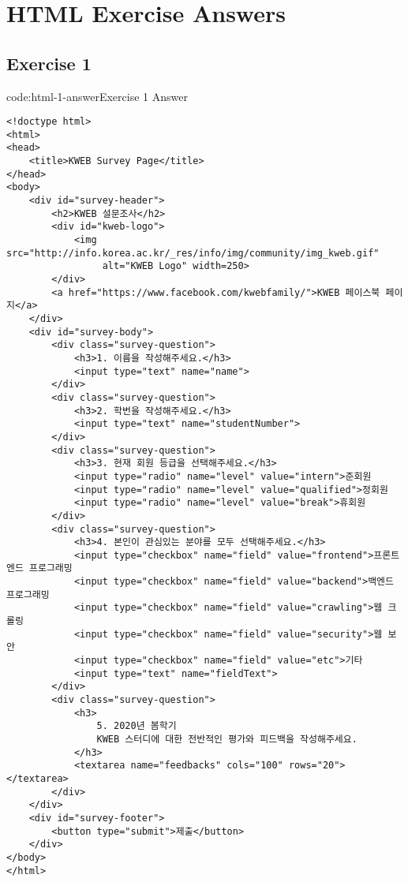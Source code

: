 \section{HTML Exercise Answers} \label{sect:html-exercise-answers}

\subsection*{Exercise 1}

\begin{codeenv}{code:html-1-answer}{Exercise 1 Answer}\begin{verbatim}
<!doctype html>
<html>
<head>
    <title>KWEB Survey Page</title>
</head>
<body>
    <div id="survey-header">
        <h2>KWEB 설문조사</h2>
        <div id="kweb-logo">
            <img src="http://info.korea.ac.kr/_res/info/img/community/img_kweb.gif"
                 alt="KWEB Logo" width=250>
        </div>
        <a href="https://www.facebook.com/kwebfamily/">KWEB 페이스북 페이지</a>
    </div>
    <div id="survey-body">
        <div class="survey-question">
            <h3>1. 이름을 작성해주세요.</h3>
            <input type="text" name="name">
        </div>
        <div class="survey-question">
            <h3>2. 학번을 작성해주세요.</h3>
            <input type="text" name="studentNumber">
        </div>
        <div class="survey-question">
            <h3>3. 현재 회원 등급을 선택해주세요.</h3>
            <input type="radio" name="level" value="intern">준회원
            <input type="radio" name="level" value="qualified">정회원
            <input type="radio" name="level" value="break">휴회원
        </div>
        <div class="survey-question">
            <h3>4. 본인이 관심있는 분야를 모두 선택해주세요.</h3>
            <input type="checkbox" name="field" value="frontend">프론트엔드 프로그래밍
            <input type="checkbox" name="field" value="backend">백엔드 프로그래밍
            <input type="checkbox" name="field" value="crawling">웹 크롤링
            <input type="checkbox" name="field" value="security">웹 보안
            <input type="checkbox" name="field" value="etc">기타
            <input type="text" name="fieldText">
        </div>
        <div class="survey-question">
            <h3>
                5. 2020년 봄학기
                KWEB 스터디에 대한 전반적인 평가와 피드백을 작성해주세요.
            </h3>
            <textarea name="feedbacks" cols="100" rows="20"></textarea>
        </div>
    </div>
    <div id="survey-footer">
        <button type="submit">제출</button>
    </div>
</body>
</html>
\end{verbatim}
\end{codeenv}
